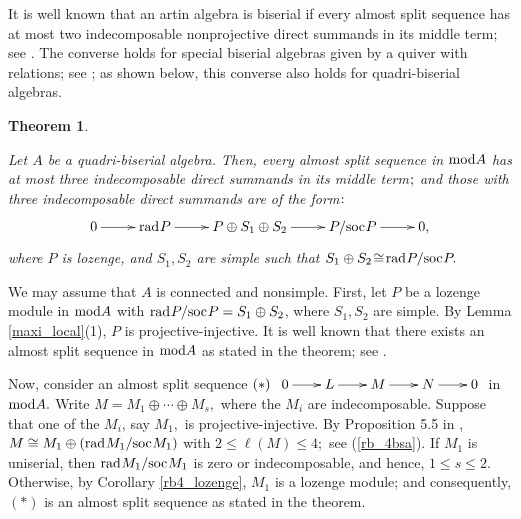 \documentclass[10pt]{amsart}
\newtheorem{Theo}{Theorem}[subsection]
\theoremstyle{definition}
\newcommand{\mmod}{{\rm mod}}
\newcommand{\rad}{{\rm rad}\hspace{.5pt}}
\newcommand{\soc}{{\rm soc}\hspace{.5pt}}
\newcommand{\hp}{\hspace{.5pt}}
\begin{document}

It is well known that an artin algebra is biserial if every almost split sequence has at most two indecomposable nonprojective direct summands in its middle term; see \cite{AuR}. The converse holds for special biserial algebras given by a quiver with relations; see \cite{BuR, SKW}; as shown below, this converse also holds for quadri-biserial algebras.

\begin{Theo}\label{beta_A} 

Let $A$ be a quadri-biserial algebra. Then, every almost split sequence in $\mmod A$ has at most three indecomposable direct summands in its middle term$\hp ;$ and those with three indecomposable direct summands are of the form$\hp\hp:$ \vspace{-4pt}
$$\xymatrix{0\ar[r] & \rad P \ar[r] & P  \oplus S_1 \oplus S_2  
\ar[r] & P/\soc P \ar[r] & 0,} \vspace{-5pt}$$ where $P$ is lozenge, and $S_1, S_2$ are simple such that $S_1\oplus S_2  \!\cong\! \rad P/\soc P.$

\end{Theo}

 \vspace{-1.5pt}

 We may assume that $A$ is connected and nonsimple. First, let $P$ be a lozenge module in $\mmod A$ with $\rad P/\soc P=S_1 \oplus S_2$, where $S_1, S_2$ are simple. By Lemma \ref{maxi_local}(1), $P$ is projective-injective. It is well known that there exists an almost split sequence in $\mmod A$ as stated in the theorem; see \cite[(V.5.5)]{ARS}. 

\vspace{-.5pt} 

Now, consider an almost split sequence 
$(*) \hspace{5pt} \xymatrixcolsep{20pt}\xymatrix{0\ar[r] & L \ar[r] & M  \ar[r] & N \ar[r] & 0} \vspace{-.5pt} $ in $\mmod A.$ Write $M=M_1 \oplus \cdots \oplus M_s,$ where the $M_i$ are indecomposable. Suppose that one of the $M_i$, say $M_1,$ is projective-injective. By Proposition 5.5 in \cite[Chapter V]{ARS}, $M\cong M_1\oplus (\rad M_1/\soc M_1)$ with $2\le \ell(M)\le 4;$ see (\ref{rb_4bsa}). If $M_1$ is uniserial, then $\rad M_1/\soc M_1$ is zero or indecomposable, and hence, $1\le s\le 2.$ Otherwise,  by Corollary \ref{rb4_lozenge}, $M_1$ is a lozenge module; and consequently, $(*)$ is an almost split sequence as stated in the theorem. 
\end{document}
